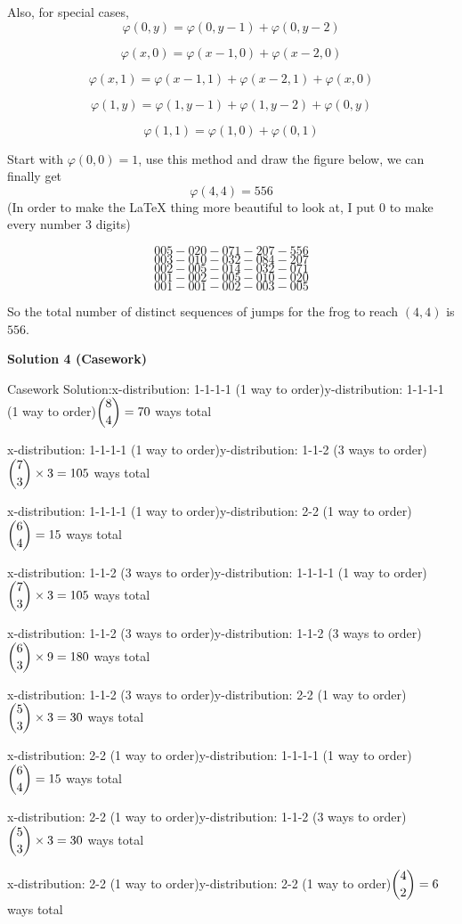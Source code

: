 \begin{enumerate}
 Also, for special cases, 
 \[\varphi (0,y)=\varphi (0,y-1)+\varphi (0,y-2)\]

 \[\varphi (x,0)=\varphi (x-1,0)+\varphi (x-2,0)\]

 \[\varphi (x,1)=\varphi (x-1,1)+\varphi (x-2,1)+\varphi (x,0)\]

 \[\varphi (1,y)=\varphi (1,y-1)+\varphi (1,y-2)+\varphi (0,y)\]

 \[\varphi (1,1)=\varphi (1,0)+\varphi (0,1)\]

 Start with $\varphi (0,0)=1$, use this method and draw the figure below, we can finally get 
 \[\varphi (4,4)=556\] (In order to make the LaTeX thing more beautiful to look at, I put $0$ to make every number $3$ digits)

 
 \[005-020-071-207-\boxed{556}\] 
 \[003-010-032-084-207\] 
 \[002-005-014-032-071\] 
 \[001-002-005-010-020\] 
 \[001-001-002-003-005\]

 So the total number of distinct sequences of jumps for the frog to reach $(4,4)$ is $\boxed {556}$.

 



\textbf{Solution 4 (Casework)}

Casework Solution:x-distribution: 1-1-1-1 (1 way to order)y-distribution: 1-1-1-1 (1 way to order)$\dbinom{8}{4} = 70$ ways total

 x-distribution: 1-1-1-1 (1 way to order)y-distribution: 1-1-2 (3 ways to order)$\dbinom{7}{3} \times 3= 105$ ways total

 x-distribution: 1-1-1-1 (1 way to order)y-distribution: 2-2 (1 way to order)$\dbinom{6}{4} = 15$ ways total

 x-distribution: 1-1-2 (3 ways to order)y-distribution: 1-1-1-1 (1 way to order)$\dbinom{7}{3} \times 3= 105$ ways total

 x-distribution: 1-1-2 (3 ways to order)y-distribution: 1-1-2 (3 ways to order)$\dbinom{6}{3} \times 9= 180$ ways total

 x-distribution: 1-1-2 (3 ways to order)y-distribution: 2-2 (1 way to order)$\dbinom{5}{3} \times 3 = 30$ ways total

 x-distribution: 2-2 (1 way to order)y-distribution: 1-1-1-1 (1 way to order)$\dbinom{6}{4} = 15$ ways total

 x-distribution: 2-2 (1 way to order)y-distribution: 1-1-2 (3 ways to order)$\dbinom{5}{3} \times 3 = 30$ ways total

 x-distribution: 2-2 (1 way to order)y-distribution: 2-2 (1 way to order)$\dbinom{4}{2} = 6$ ways total


\end{enumerate}
